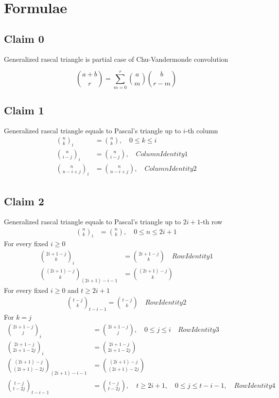 \documentclass[12pt,letterpaper,oneside,reqno]{amsart}
\newcommand \rascalNumber [3] {\binom{#1}{#2}_{#3}}
\numberwithin{equation}{section}
\begin{document}
\section{Formulae}\label{sec:formulae}

\subsection{Claim 0} Generalized rascal triangle is partial case of Chu-Vandermonde convolution

\begin{equation*}
    \binom{a+b}{r} = \sum_{m=0}^{r} \binom{a}{m} \binom{b}{r-m}
\end{equation*}

\subsection{Claim 1} Generalized rascal triangle equals to Pascal's triangle up to $i$-th column
\begin{align}
    \rascalNumber{n}{k}{i}          &= \binom{n}{k}, \quad 0 \leq k \leq i \\
    \rascalNumber{n}{i-j}{i}        &= \binom{n}{i-j}, \quad ColumnIdentity1 \\
    \rascalNumber{n}{n-i+j}{i}      &= \binom{n}{n-i+j}, \quad ColumnIdentity2 \\
\end{align}

\subsection{Claim 2} Generalized rascal triangle equals to Pascal's triangle up to $2i+1$-th row
\begin{align}
    \rascalNumber{n}{k}{i}                  &= \binom{n}{k}, \quad 0 \leq n \leq 2i+1
\end{align}
For every fixed $i \geq 0$
\begin{align}
    \rascalNumber{2i+1-j}{k}{i}             &= \binom{2i+1-j}{k} \quad RowIdentity1 \\
    \rascalNumber{(2i+1)-j}{k}{(2i+1)-i-1}  &= \binom{(2i+1)-j}{k}
\end{align}
For every fixed $i \geq 0$ and $t \geq 2i+1$
\begin{align}
    \rascalNumber{t-j}{k}{t-i-1}            = \binom{t-j}{k} \quad RowIdentity2
\end{align}
For $k=j$
\begin{align*}
    \rascalNumber{2i+1-j}{j}{i}         &= \binom{2i+1-j}{j}, \quad 0 \leq j \leq i \quad RowIdentity3 \\
    \rascalNumber{2i+1-j}{2i+1-2j}{i}   &= \binom{2i+1-j}{2i+1-2j} \\
    \rascalNumber{(2i+1)-j}{(2i+1)-2j}{(2i+1)-i-1}   &= \binom{(2i+1)-j}{(2i+1)-2j} \\
    \rascalNumber{t-j}{t-2j}{t-i-1}     &= \binom{t-j}{t-2j}, \quad t \geq 2i+1, \quad 0 \leq j \leq t-i-1, \quad RowIdentity4 \\
\end{align*}
\end{document}
